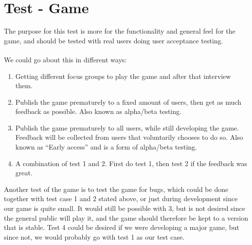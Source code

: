 		\section{Test - Game}
The purpose for this test is more for the functionality and general feel for
 the game, and should be tested with real users doing user acceptance testing.
\\
\\
We could go about this in different ways:
	\begin{enumerate}
		\item Getting different focus groups to play the game and after that
    interview them.
		\item Publish the game prematurely to a fixed amount of users, then get
    as much feedback as possible. Also known as alpha/beta testing.
		\item Publish the game prematurely to all users, while still developing
    the game. Feedback will be collected from users that voluntarily chooses
    to do so. Also known as “Early access” and is a form of alpha/beta testing.
		\item A combination of test 1 and 2. First do test 1, then test 2 if the
    feedback was great.
	\end{enumerate}
Another test of the game is to test the game for bugs, which could be done
together with test case 1 and 2 stated above, or just during development since
 our game is quite small. It would still be possible with 3, but is not
 desired since the general public will play it, and the game should therefore
  be kept to a version that is stable. Test 4 could be desired if we were
   developing a major game, but since not, we would probably go with test
    1 as our test case.
